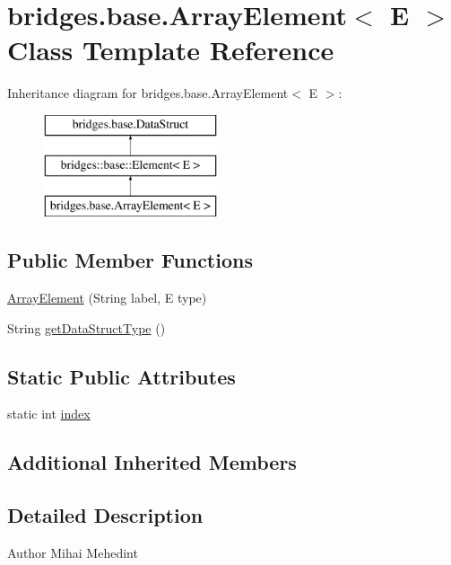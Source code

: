 \hypertarget{classbridges_1_1base_1_1_array_element}{}\section{bridges.\+base.\+Array\+Element$<$ E $>$ Class Template Reference}
\label{classbridges_1_1base_1_1_array_element}
Inheritance diagram for bridges.\+base.\+Array\+Element$<$ E $>$\+:\begin{figure}[H]
\begin{center}
\leavevmode
\includegraphics[height=3.000000cm]{classbridges_1_1base_1_1_array_element}
\end{center}
\end{figure}
\subsection*{Public Member Functions}
\begin{DoxyCompactItemize}
\item 
\hyperlink{classbridges_1_1base_1_1_array_element_a90cbba952d50ff26fd2b89e9f3f81322}{Array\+Element} (String label, E type)
\item 
String \hyperlink{classbridges_1_1base_1_1_array_element_a1d4f3fae7bd986237e364c2cce0bea77}{get\+Data\+Struct\+Type} ()
\end{DoxyCompactItemize}
\subsection*{Static Public Attributes}
\begin{DoxyCompactItemize}
\item 
static int \hyperlink{classbridges_1_1base_1_1_array_element_a79c69e5046da8c297026d1e457a23182}{index}
\end{DoxyCompactItemize}
\subsection*{Additional Inherited Members}


\subsection{Detailed Description}
\begin{DoxyAuthor}{Author}
Mihai Mehedint 
\end{DoxyAuthor}

